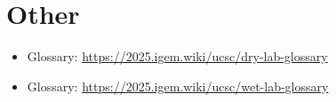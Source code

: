 \section{Other}
\begin{itemize}
    \item Glossary: \url{https://2025.igem.wiki/ucsc/dry-lab-glossary}
    \item Glossary: \url{https://2025.igem.wiki/ucsc/wet-lab-glossary}
\end{itemize}





